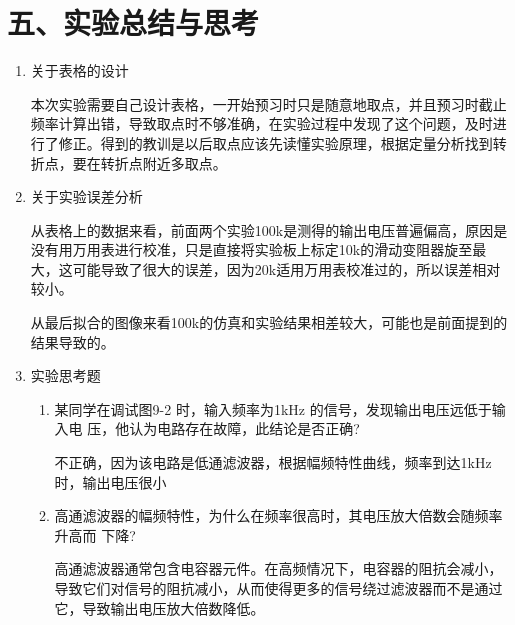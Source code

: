 \documentclass[a4paper,10pt,notitlepage]{article}
\begin{document}
\section*{五、实验总结与思考}
\begin{enumerate}
	\item 关于表格的设计\par 
	\qquad 本次实验需要自己设计表格，一开始预习时只是随意地取点，并且预习时截止频率计算出错，导致取点时不够准确，在实验过程中发现了这个问题，及时进行了修正。得到的教训是以后取点应该先读懂实验原理，根据定量分析找到转折点，要在转折点附近多取点。
	\item 关于实验误差分析\par 
	\qquad 从表格上的数据来看，前面两个实验100k是测得的输出电压普遍偏高，原因是没有用万用表进行校准，只是直接将实验板上标定10k的滑动变阻器旋至最大，这可能导致了很大的误差，因为20k适用万用表校准过的，所以误差相对较小。\par
	\qquad 从最后拟合的图像来看100k的仿真和实验结果相差较大，可能也是前面提到的结果导致的。
	\item 实验思考题
	\begin{enumerate}
		\item 某同学在调试图9-2 时，输入频率为1kHz 的信号，发现输出电压远低于输入电
		压，他认为电路存在故障，此结论是否正确?\par 
		\qquad 不正确，因为该电路是低通滤波器，根据幅频特性曲线，频率到达1kHz时，输出电压很小
		\item 高通滤波器的幅频特性，为什么在频率很高时，其电压放大倍数会随频率升高而
		下降?\par 
		\qquad 高通滤波器通常包含电容器元件。在高频情况下，电容器的阻抗会减小，导致它们对信号的阻抗减小，从而使得更多的信号绕过滤波器而不是通过它，导致输出电压放大倍数降低。
	\end{enumerate}
\end{enumerate}
\end{document}
